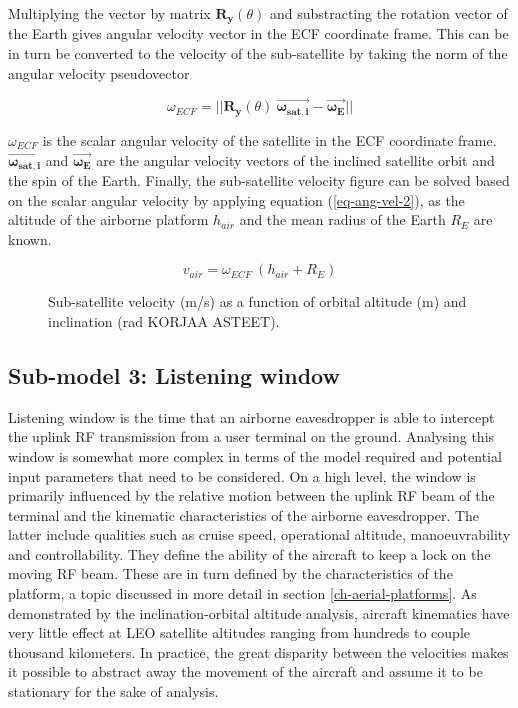 \documentclass[english, 12pt, a4paper, elec, utf8, a-1b, online]{aaltothesis}
\begin{document}
Multiplying the vector by matrix $\bm{R_y}(\theta)$ and substracting the rotation vector of the Earth gives angular velocity vector in the ECF coordinate frame.
This can be in turn be converted to the velocity of the sub-satellite by taking the norm of the angular velocity pseudovector

\begin{equation*}
  \omega_{ECF} =
  ||\bm{R_y}(\theta)\ \bm{\vec{\omega_{sat, i}}} - \bm{\vec{\omega_{E}}}||
\end{equation*}

$\omega_{ECF}$ is the scalar angular velocity of the satellite in the ECF coordinate frame.
$\bm{\vec{\omega_{sat, i}}}$ and $\bm{\vec{\omega_{E}}}$ are the angular velocity vectors of the inclined satellite orbit and the spin of the Earth.
Finally, the sub-satellite velocity figure can be solved based on the scalar angular velocity by applying equation (\ref{eq-ang-vel-2}), as the altitude of the airborne platform $h_{air}$ and the mean radius of the Earth $R_E$ are known.

\begin{equation}
  v_{air} = \omega_{ECF}\ (h_{air} + R_E)
\end{equation}

\begin{figure}[h]
  \centering
  
  \caption{Sub-satellite velocity (m/s) as a function of orbital altitude (m) and inclination (rad KORJAA ASTEET).} %
  \label{fig-subsat-velocity-inclined}
\end{figure}

\subsection{Sub-model 3: Listening window} \label{ch-results-submodel-3-window}

Listening window is the time that an airborne eavesdropper is able to intercept the uplink RF transmission from a user terminal on the ground.
Analysing this window is somewhat more complex in terms of the model required and potential input parameters that need to be considered.
On a high level, the window is primarily influenced by the relative motion between the uplink RF beam of the terminal and the kinematic characteristics of the airborne eavesdropper.
The latter include qualities such as cruise speed, operational altitude, manoeuvrability and controllability.
They define the ability of the aircraft to keep a lock on the moving RF beam.
These are in turn defined by the characteristics of the platform, a topic discussed in more detail in section \ref{ch-aerial-platforms}.
As demonstrated by the inclination-orbital altitude analysis, aircraft kinematics have very little effect at LEO satellite altitudes ranging from hundreds to couple thousand kilometers. In practice, the great disparity between the velocities makes it possible to abstract away the movement of the aircraft and assume it to be stationary for the sake of analysis.
\end{document}
